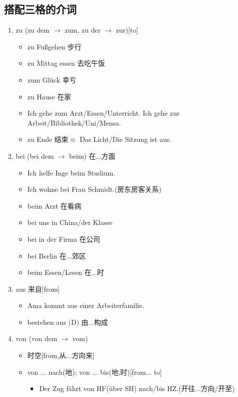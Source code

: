 \documentclass[12pt,A4paper,oneside,reqno]{amsart}
\numberwithin{equation}{section}
\theoremstyle{plain}
\theoremstyle{plain}
\theoremstyle{plain}
\numberwithin{equation}{section}
\theoremstyle{remark}
\begin{document}
\subsection{搭配三格的介词}
\begin{enumerate}[1.]
	\item zu (zu dem $\rightarrow$ zum, zu der $\rightarrow$ zur)[to]
		\begin{itemize}\renewcommand\labelitemi{\normalfont\bfseries \textendash}
			\item zu Fu\ss gehen 步行
			\item zu Mittag essen 去吃午饭
			\item zum Gl\"{u}ck 幸亏
			\item zu Hause 在家
			\item Ich gehe zum Arzt/Essen/Unterricht. Ich gehe zur Arbeit/Bibliothek/Uni/Mensa.
			\item zu Ende 结束$\approx$ Das Licht/Die Sitzung ist aus.
		\end{itemize}	
	\item bei (bei dem $\rightarrow$ beim) 在...方面
	\renewcommand\labelitemi{\normalfont\bfseries \textendash}
	\begin{itemize}
		\item Ich helfe Inge beim Studium.
		\item Ich wohne bei Frau Schmidt.(房东房客关系)
		\item beim Arzt 在看病
		\item bei uns in China/der Klasse
		\item bei in der Firma 在公司
		\item bei Berlin 在...郊区
		\item beim Essen/Lesen 在...时
	\end{itemize}
	\item aus 来自[from]
			\begin{itemize}\renewcommand\labelitemi{\normalfont\bfseries \textendash}
				\item Ama kommt aus einer Arbeiterfamilie.
				\item bestehen aus (D) 由...构成
			\end{itemize}
	\item von (von dem $\rightarrow$ vom)
	\begin{itemize}
		\item 时空[from,从...方向来]
		\item []von ... nach(地); von ... bis(地,时)[from... to]
		\begin{itemize}
			\item Der Zug f\"{a}hrt von HF(\"{u}ber SH) nach/bis HZ.(开往...方向/开至)

\end{itemize}
\end{itemize}
\end{enumerate}
\end{document}
